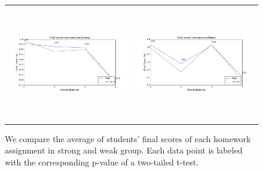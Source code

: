 \documentclass{article} %
\begin{document}
\begin{figure}[h]
\centering
	\begin{tabular}{c c}
		\includegraphics[width=0.5\linewidth, height=5cm]{image/strong_final_compare_assign} &
        \includegraphics[width=0.5\linewidth, height=5cm]{image/weak_final_compare_assign}
    \end{tabular}
    \caption{We compare the average of students' final scores of each homework assignment in strong and weak group. Each data point is labeled with the corresponding p-value of a two-tailed t-test.}
    \label{fig:sw_assign_compare}
\end{figure}




\end{document}
